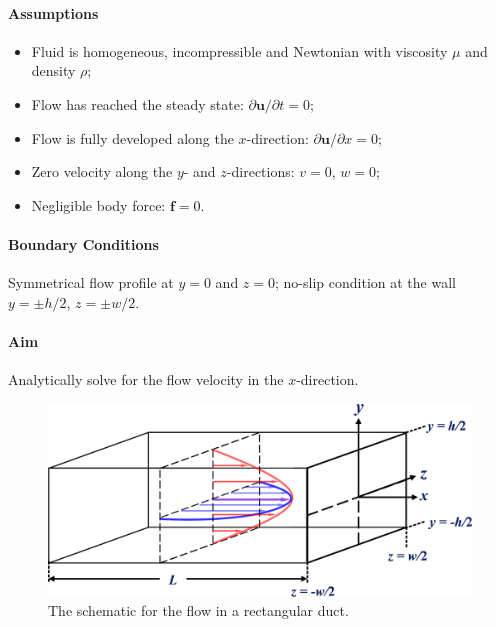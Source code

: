\documentclass[a4paper]{article}
\begin{document}
\paragraph{Assumptions}
\begin{itemize}
    \item Fluid is homogeneous, incompressible and Newtonian with viscosity $\mu$ and density $\rho$;
    
    \item Flow has reached the steady state: $\partial \mathbf{u}/\partial t = 0$;
    
    \item Flow is fully developed along the $x$-direction: $\partial \mathbf{u} / \partial x = 0$;

    \item Zero velocity along the $y$- and $z$-directions: $v=0$, $w=0$;

    \item Negligible body force: $\mathbf{f} = 0$.
\end{itemize}

\paragraph{Boundary Conditions} Symmetrical flow profile at $y=0$ and $z=0$; no-slip condition at the wall $y=\pm h/2$, $z=\pm w/2$.

\paragraph{Aim} Analytically solve for the flow velocity in the $x$-direction.

\begin{figure}[h]
    \centering
    \includegraphics[width=.65\textwidth]{img/sqr_duct.eps}
    \caption{The schematic for the flow in a rectangular duct.}
    \label{fig:sqr_duct}
\end{figure}
\end{document}
